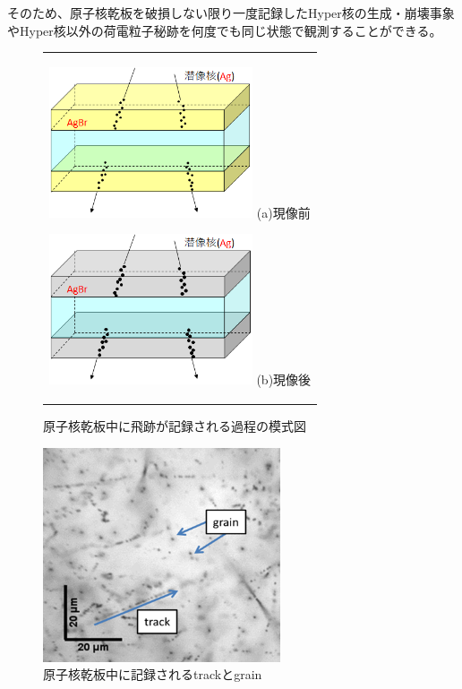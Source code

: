\documentclass[12pt,a4paper]{jarticle}
\begin{document}
そのため、原子核乾板を破損しない限り一度記録したHyper核の生成・崩壊事象やHyper核以外の荷電粒子秘跡を何度でも同じ状態で観測することができる。
\par
\begin{figure}[htbp]
  \centering
      \begin{tabular}{c}
        \begin{minipage}{0.5\hsize}
          \centering
            \includegraphics[clip, width=60mm]{process_bdev.png}
            \hspace{1.6cm} (a)現像前
        \end{minipage}
        
        \begin{minipage}{0.5\hsize}
          \centering
            \includegraphics[clip, width=60mm]{process_adev.png}
            \hspace{1.6cm} (b)現像後
        \end{minipage}
    
      \end{tabular}
      \caption{原子核乾板中に飛跡が記録される過程の模式図\label{fig:process_recored_track}}
\end{figure}
\begin{figure}[htbp]
 \centering
      \includegraphics[width=70mm]{grainfog.png}
 \caption{原子核乾板中に記録されるtrackとgrain\label{fig:grain_track}}
\end{figure}
\end{document}
